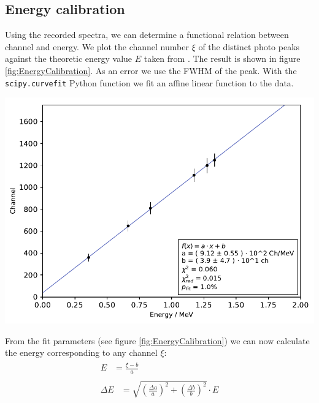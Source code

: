 \subsection*{Energy calibration}
%
Using the recorded spectra, we can determine a functional relation between channel and energy.
We plot the channel number $\xi$ of the distinct photo peaks against the theoretic energy value $E$ taken from \cite{Anleitung}.
The result is shown in figure \ref{fig:EnergyCalibration}.
As an error we use the FWHM of the peak.
With the \texttt{scipy.curvefit} Python function we fit an affine linear function to the data.
%
\par
%
\minipage{\linewidth}
    \begin{center}
        \captionsetup{type=figure}
        \begin{adjustbox}{max width=\linewidth, keepaspectratio}
            \includegraphics[]{pdf/energy_calibration}
        \end{adjustbox}
        \label{fig:EnergyCalibration}
    \end{center}
\endminipage
%
\par
%
From the fit parameters (see figure \ref{fig:EnergyCalibration}) we can now calculate the energy corresponding to any channel $\xi$:
\begin{align}
    \label{eq:}
    \begin{split}
        E &= \frac{\xi - b}{a}
    \end{split}
    \\
    \label{eq:}
    \begin{split}
        \Delta E &= \sqrt{ \left ( \frac{ \Delta a}{ a } \right ) ^2 + \left ( \frac{\Delta b}{b} \right ) ^2 } \cdot E
    \end{split}
\end{align}
%
